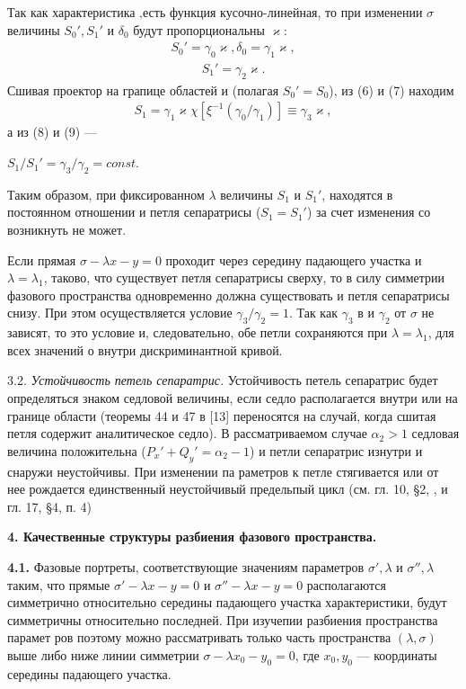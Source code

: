 \documentclass{article}
\newcommand{\RomanNumeralCaps}[1]
    {\MakeUppercase{\romannumeral #1}}
\begin{document}
Так как характеристика ‚есть функция кусочно-линейная, то
при изменении $\sigma$ величины $S_{0}', S_{1}'$ и $\delta_{0}$ будут пропорциональны $\varkappa$:
\begin{gather}
S_{0}' = \gamma_{0} \varkappa, \delta_{0} = \gamma_{1} \varkappa,
\tag{7}
\end{gather}
\begin{gather}
S_{1}' = \gamma_{2} \varkappa.
\tag{8}
\end{gather}
Сшивая проектор на грапице областей \RomanNumeralCaps{1} и \RomanNumeralCaps{2} (полагая
$S_{0}' = S_{0}$), из (6) и (7) находим
\begin{gather}
S_{1} = \gamma_{1} \varkappa \chi [\xi^{-1} (\gamma_{0} / \gamma_{1})] \equiv \gamma_{3} \varkappa,
\tag{9}
\end{gather}
а из (8) и (9) —
\begin{center}
$S_{1} / S_{1}' = \gamma_{3} / \gamma_{2} = const.$
\end{center}
Таким образом, при фиксированном $\lambda$ величины $S_{1}$ и $S_{1}'$, находятся 
в постоянном отношении и петля сепаратрисы ($S_{1} = S_{1}'$)
за счет изменения со возникнуть не может.

Если прямая $\sigma - \lambda x - y = 0$ проходит через середину падающего 
участка и $\lambda = \lambda_{1}$, таково, что существует петля сепаратрисы
сверху, то в силу симметрии фазового пространства одновременно
должна существовать и петля сепаратрисы снизу. При этом осуществляется 
условие $\gamma_{3} / \gamma_{2} = 1$. Так как $\gamma_{3}$ в и $\gamma_{2}$ от $\sigma$ не зависят, то
это условие и, следовательно, обе петли сохраняются при $\lambda = \lambda_{1}$,
для всех значений о внутри дискриминантной кривой.

3.2. \textit{Устойчивость петель сепаратрис.} Устойчивость петель сепаратрис 
будет определяться знаком седловой величины, если
седло располагается внутри или на границе области \RomanNumeralCaps{2} (теоремы 
44 и 47 в [13] переносятся на случай, когда сшитая петля содержит 
аналитическое седло). В рассматриваемом случае $\alpha_{2} > 1$
седловая величина положительна ($P_{x}' + Q_{y}' = \alpha_{2} - 1$) и петли сепаратрис 
изнутри и снаружи неустойчивы. При изменении па
раметров к петле стягивается или от нее рождается единственный
неустойчивый предельпый цикл (см. гл. 10, \S 2, \RomanNumeralCaps{4}, и гл. 17,
\S 4, п. 4)

\textbf{4. Качественные структуры разбиения фазового пространства.}

\textbf{4.1.} Фазовые портреты, соответствующие значениям параметров 
$\sigma', \lambda$ и $\sigma'', \lambda$ таким, что прямые $\sigma' - \lambda x - y = 0$ и $\sigma'' -
\lambda x - y = 0$ располагаются симметрично относительно середины
падающего участка характеристики, будут симметричны относительно 
последней. При изучепии разбиения пространства парамет
ров поэтому можно рассматривать только часть пространства
$(\lambda, \sigma)$ выше либо ниже линии симметрии $\sigma - \lambda x_{0} - y_{0} = 0$, где $x_{0},
y_{0}$ — координаты середины падающего участка.
\end{document}
